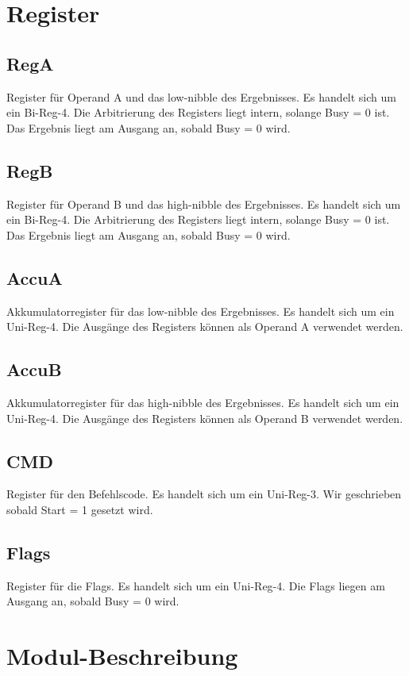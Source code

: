 \documentclass[11pt]{report}
\begin{document}
	\section{Register}
	\subsection{RegA}
	Register für Operand A und das low-nibble des Ergebnisses.
	Es handelt sich um ein Bi-Reg-4.
	Die Arbitrierung des Registers liegt intern, solange Busy = 0 ist.
	Das Ergebnis liegt am Ausgang an, sobald Busy = 0 wird.
	
	\subsection{RegB}
	Register für Operand B und das high-nibble des Ergebnisses.
	Es handelt sich um ein Bi-Reg-4.
	Die Arbitrierung des Registers liegt intern, solange Busy = 0 ist.
	Das Ergebnis liegt am Ausgang an, sobald Busy = 0 wird.
	
	\subsection{AccuA}
	Akkumulatorregister für das low-nibble des Ergebnisses.
	Es handelt sich um ein Uni-Reg-4.
	Die Ausgänge des Registers können als Operand A verwendet werden.
	
	\subsection{AccuB}
	Akkumulatorregister für das high-nibble des Ergebnisses.
	Es handelt sich um ein Uni-Reg-4.
	Die Ausgänge des Registers können als Operand B verwendet werden.
	
	\subsection{CMD}
	Register für den Befehlscode.
	Es handelt sich um ein Uni-Reg-3. Wir geschrieben sobald Start = 1 gesetzt wird.
	
	\subsection{Flags}
	Register für die Flags.
	Es handelt sich um ein Uni-Reg-4.
	Die Flags liegen am Ausgang an, sobald Busy = 0 wird.
	
	
	\section{Modul-Beschreibung}
\end{document}
